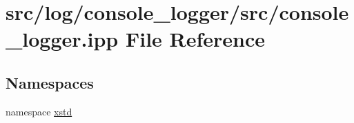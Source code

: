\hypertarget{console__logger_8ipp}{\section{src/log/console\-\_\-logger/src/console\-\_\-logger.ipp File Reference}
\label{console__logger_8ipp}
}
\subsection*{Namespaces}
\begin{DoxyCompactItemize}
\item 
namespace \hyperlink{namespacexstd}{xstd}
\end{DoxyCompactItemize}
